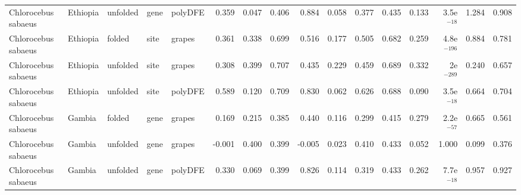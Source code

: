 \begin{longtable}{lllllrrrrrrrrrrr}
 Chlorocebus sabaeus &                  Ethiopia &  unfolded &  gene &  polyDFE &                              0.359 &                               0.047 &                 0.406 &                 0.884 &                              0.058 &                               0.377 &                 0.435 &                 0.133 &  3.5e$^{-18}$ &  1.284 &  0.908 \\
 Chlorocebus sabaeus &                  Ethiopia &    folded &  site &   grapes &                              0.361 &                               0.338 &                 0.699 &                 0.516 &                              0.177 &                               0.505 &                 0.682 &                 0.259 & 4.8e$^{-196}$ &  0.884 &  0.781 \\
 Chlorocebus sabaeus &                  Ethiopia &  unfolded &  site &   grapes &                              0.308 &                               0.399 &                 0.707 &                 0.435 &                              0.229 &                               0.459 &                 0.689 &                 0.332 &   2e$^{-289}$ &  0.240 &  0.657 \\
 Chlorocebus sabaeus &                  Ethiopia &  unfolded &  site &  polyDFE &                              0.589 &                               0.120 &                 0.709 &                 0.830 &                              0.062 &                               0.626 &                 0.688 &                 0.090 &  3.5e$^{-18}$ &  0.664 &  0.704 \\
 Chlorocebus sabaeus &                    Gambia &    folded &  gene &   grapes &                              0.169 &                               0.215 &                 0.385 &                 0.440 &                              0.116 &                               0.299 &                 0.415 &                 0.279 &  2.2e$^{-57}$ &  0.665 &  0.561 \\
 Chlorocebus sabaeus &                    Gambia &  unfolded &  gene &   grapes &                             -0.001 &                               0.400 &                 0.399 &                -0.005 &                              0.023 &                               0.410 &                 0.433 &                 0.052 &         1.000 &  0.099 &  0.376 \\
 Chlorocebus sabaeus &                    Gambia &  unfolded &  gene &  polyDFE &                              0.330 &                               0.069 &                 0.399 &                 0.826 &                              0.114 &                               0.319 &                 0.433 &                 0.262 &  7.7e$^{-18}$ &  0.957 &  0.927 \\

\end{longtable}
